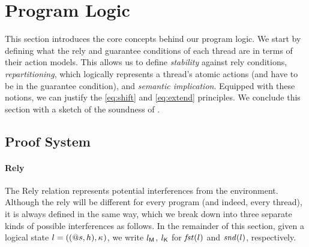 \section{\colosl Program Logic}
\label{sec:semantics}

This section introduces the core concepts behind our program logic. We
start by defining what the rely and guarantee conditions of each
thread are in terms of their action models. This allows us to define
\emph{stability} against rely conditions, \emph{repartitioning},
which logically represents a thread's atomic actions (and have to be in
the guarantee condition), and \emph{semantic implication}. Equipped
with these notions, we can justify the \eqref{eq:shift} and
\eqref{eq:extend} principles. We conclude this section with a sketch
of the soundness of \colosl.

\subsection{Proof System}

\paragraph{Rely}
The Rely relation represents potential interferences from the
environment. Although the rely will be different for every program
(and indeed, every thread), it is always defined in the same way,
which we break down into three separate kinds of possible
interferences as follows. In the remainder of this section, given a
logical state $l = ((@s,h),\kappa_{})$, we write $l_{\textsf{M}}$, $l_{\textsf{K}}$ for
$\mathit{fst}(l)$ and $\mathit{snd}(l)$, respectively.

